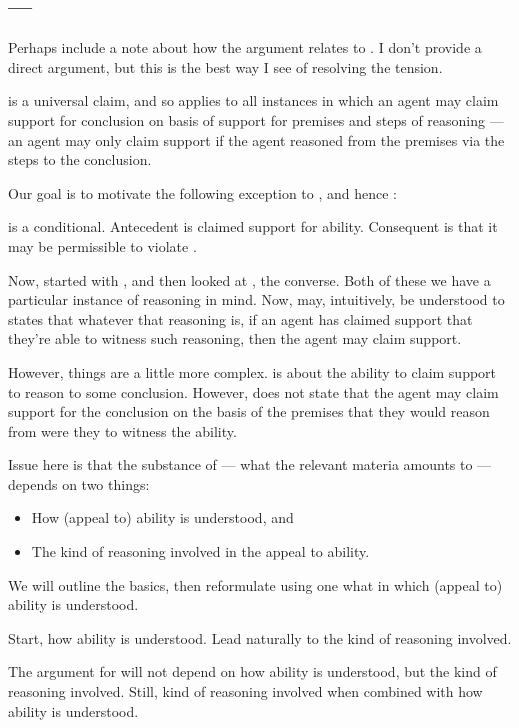 \subsection{\EAS{} --- \EAS{-}}
\label{sec:eas}

{
  \color{red}
  Perhaps include a note about how the argument relates to \EAS{}.
  I don't provide a direct argument, but this is the best way I see of resolving the tension.
}

\begin{note}[Alternative]
  \ESU{} is a universal claim, and so applies to all instances in which an agent may claim support for conclusion on basis of support for premises and steps of reasoning --- an agent may only claim support if the agent reasoned from the premises via the steps to the conclusion.

  Our goal is to motivate the following exception to \gESU{}, and hence \ESU{}:

  \goalEAS*
\end{note}

\begin{note}
  \EAS{} is a conditional.
  Antecedent is claimed support for ability.
  Consequent is that it may be permissible to violate \gESU{}.
\end{note}

\begin{note}
  Now, started with \USE{}, and then looked at \ESU{}, the converse.
  Both of these we have a particular instance of reasoning in mind.
  Now, \EAS{} may, intuitively, be understood to states that whatever that reasoning is, if an agent has claimed support that they're able to witness such reasoning, then the agent may claim support.

  However, things are a little more complex.
  \EAS{} is about the ability to claim support to reason to some conclusion.
  However, \EAS{} does not state that the agent may claim support for the conclusion on the basis of the premises that they would reason from were they to witness the ability.

  Issue here is that the substance of \EAS{} --- what the relevant materia amounts to --- depends on two things:
  \begin{itemize}
  \item How (appeal to) ability is understood, and
  \item The kind of reasoning involved in the appeal to ability.
  \end{itemize}

  We will outline the basics, then reformulate \EAS{} using one what in which (appeal to) ability is understood.

  Start, how ability is understood.
  Lead naturally to the kind of reasoning involved.

  The argument for \EAS{} will not depend on how ability is understood, but the kind of reasoning involved.
  Still, kind of reasoning involved when combined with how ability is understood.
\end{note}

